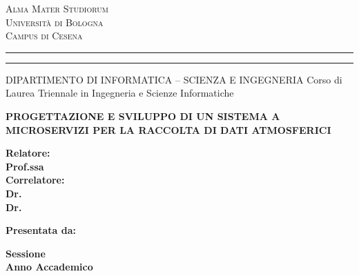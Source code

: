 
\oddsidemargin=25pt

\begin{titlepage}
\begin{center}
{
	{\Large{\textsc{Alma Mater Studiorum}}}\\
	{\Large{\textsc{Universit\`a di Bologna}}} \\
	{\textsc{Campus di Cesena}}
	\rule[0.1cm]{14cm}{0.1mm}
	\rule[0.5cm]{14cm}{0.6mm}
	DIPARTIMENTO DI INFORMATICA – SCIENZA E INGEGNERIA
	Corso di Laurea Triennale in Ingegneria e Scienze Informatiche
}
\end{center}
\vspace{15mm}
\begin{center}
{\LARGE{\bf PROGETTAZIONE E SVILUPPO DI UN SISTEMA A MICROSERVIZI PER LA RACCOLTA DI DATI ATMOSFERICI}}
\end{center}
\vspace{40mm}
\par
\noindent
\begin{minipage}[t]{0.47\textwidth}
{\large{\bf Relatore:\\Prof.ssa \xsupervisor}}
\vspace{5mm}
{\large{\bf \\Correlatore:\\Dr. \xcorrelatored\\Dr. \xcorrelatoreo}}
\end{minipage}
\hfill
\begin{minipage}[t]{0.47\textwidth}\raggedleft
{\large{\bf Presentata da:\\\xstudent}}
\end{minipage}
\vspace{20mm}
\begin{center}
{\large{\bf Sessione \xsession\\Anno Accademico \xaccademicyear}}
\end{center}
\end{titlepage}